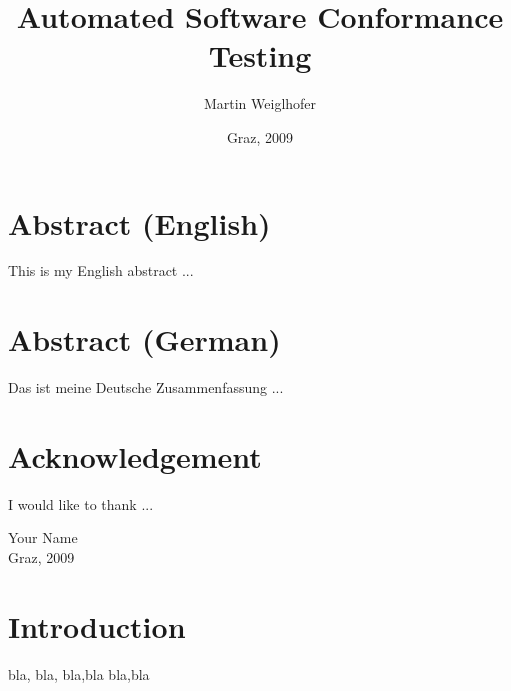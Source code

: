 \documentclass{thesis}
\begin{document}
\subject{Dissertation}
\title{Automated Software Conformance Testing}
\author{Martin Weiglhofer}
\date{Graz, 2009}

\maketitle

\frontmatter

\chapter*{Abstract (English)}
This is my English abstract ...

\chapter*{Abstract (German)}
Das ist meine Deutsche Zusammenfassung ...

\chapter*{Acknowledgement}
I would like to thank ...

\vspace{2cm}
\begin{flushright}
Your Name \\ {\small Graz, 2009}
\end{flushright}
\newpage

\statdecl

\tableofcontents
\listoffigures
\listoftables

\mainmatter

\chapter{Introduction}

bla, bla,
\newpage
bla,bla
\newpage
bla,bla

\appendix


\end{document}
